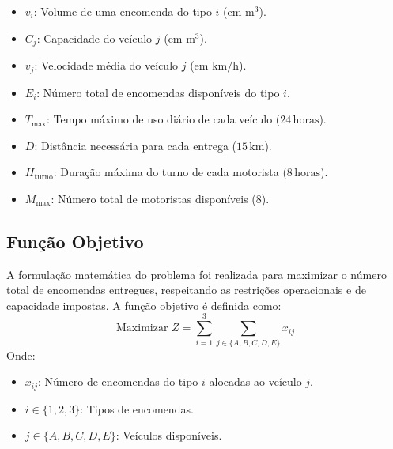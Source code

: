 \begin{itemize}
    \item \( v_i \): Volume de uma encomenda do tipo \( i \) (em \( \mathrm{m^3} \)).
    \item \( C_j \): Capacidade do veículo \( j \) (em \( \mathrm{m^3} \)).
    \item \( v_j \): Velocidade média do veículo \( j \) (em \( \mathrm{km/h} \)).
    \item \( E_i \): Número total de encomendas disponíveis do tipo \( i \).
    \item \( T_{\max} \): Tempo máximo de uso diário de cada veículo (\( 24 \, \mathrm{horas} \)).
    \item \( D \): Distância necessária para cada entrega (\( 15 \, \mathrm{km} \)).
    \item \( H_{\text{turno}} \): Duração máxima do turno de cada motorista (\( 8 \, \mathrm{horas} \)).
    \item \( M_{\max} \): Número total de motoristas disponíveis (\( 8 \)).
\end{itemize}

\subsection{Função Objetivo}\label{subsec:funcobj}
A formulação matemática do problema foi realizada para maximizar o número total de encomendas entregues, respeitando as restrições operacionais e de capacidade impostas.
A função objetivo é definida como:
\[
    \text{Maximizar } Z = \sum_{i=1}^{3} \sum_{j \in \{A, B, C, D, E\}} x_{ij}
\]
Onde:
\begin{itemize}
    \item \( x_{ij} \): Número de encomendas do tipo \( i \) alocadas ao veículo \( j \).
    \item \( i \in \{1, 2, 3\} \): Tipos de encomendas.
    \item \( j \in \{A, B, C, D, E\} \): Veículos disponíveis.
\end{itemize}


